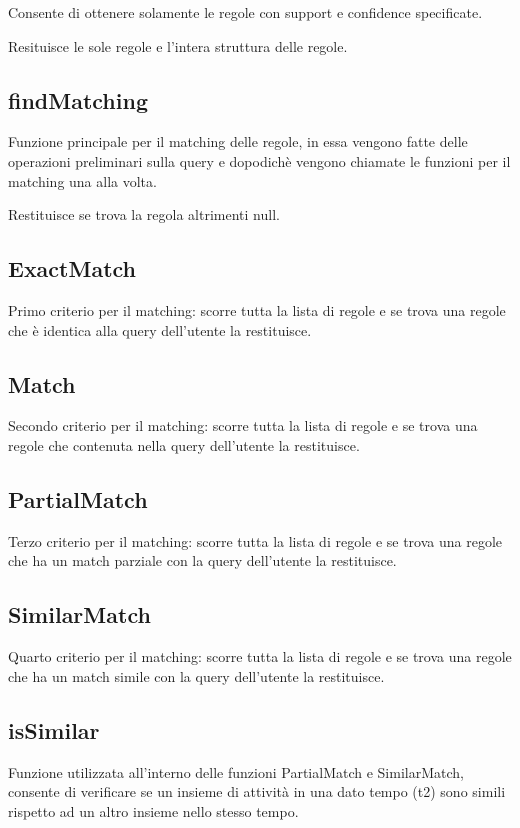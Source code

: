 \documentclass{article}
\begin{document}
Consente di ottenere solamente le regole con support e confidence specificate.

Resituisce le sole regole e l'intera struttura delle regole.

\subsection{findMatching}
Funzione principale per il matching delle regole, in essa vengono fatte delle operazioni preliminari sulla query e dopodichè vengono chiamate le funzioni per il matching una alla volta.

Restituisce se trova la regola altrimenti null.

\subsection{ExactMatch}
Primo criterio per il matching: scorre tutta la lista di regole e se trova una regole che è identica alla query dell'utente la restituisce. 

\subsection{Match}
Secondo criterio per il matching: scorre tutta la lista di regole e se trova una regole che contenuta nella query dell'utente la restituisce. 

\subsection{PartialMatch}
Terzo criterio per il matching: scorre tutta la lista di regole e se trova una regole che ha un match parziale con la query dell'utente la restituisce.

\subsection{SimilarMatch}
Quarto criterio per il matching: scorre tutta la lista di regole e se trova una regole che ha un match simile con la query dell'utente la restituisce.

\subsection{isSimilar}
Funzione utilizzata all'interno delle funzioni PartialMatch e SimilarMatch, consente di verificare se un insieme di attività in una dato tempo (t2) sono simili rispetto ad un altro insieme nello stesso tempo.
\end{document}
